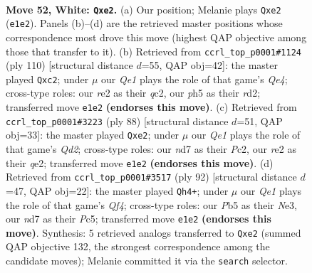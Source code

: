 \documentclass[11pt]{article}
\begin{document}
\clearpage

\begin{figure}[p]\centering
\begin{subfigure}{0.46\textwidth}\centering
\resizebox{\linewidth}{!}{%
\newchessgame
\chessboard[
  setfen={r7/3n3k/1q6/1P5p/p1Np4/P7/4r3/3RQ1K1 w - - 0 52},
  showmover=false,
  pgfstyle=straightmove, color=movearrow, markmove={e1-e2}
]}
\caption{}
\end{subfigure}\hfill
\begin{subfigure}{0.46\textwidth}\centering
\resizebox{\linewidth}{!}{%
\newchessgame
\chessboard[
  setfen={8/1p3k2/p4p2/P7/4Q1P1/5R1K/2qr3P/8 w - - 8 56},
  showmover=false,
  pgfstyle=straightmove, color=movearrow, markmove={e4-c2}
]}
\caption{}
\end{subfigure}
\\[4pt]
\begin{subfigure}{0.46\textwidth}\centering
\resizebox{\linewidth}{!}{%
\newchessgame
\chessboard[
  setfen={1r4k1/5R2/p5p1/2p5/2N5/1P4n1/K1PQq3/8 w - - 1 45},
  showmover=false,
  pgfstyle=straightmove, color=movearrow, markmove={d2-e2}
]}
\caption{}
\end{subfigure}\hfill
\begin{subfigure}{0.46\textwidth}\centering
\resizebox{\linewidth}{!}{%
\newchessgame
\chessboard[
  setfen={7k/5rq1/3Pr1p1/2P5/5Q2/p3N3/P1K5/6R1 w - - 1 47},
  showmover=false,
  pgfstyle=straightmove, color=movearrow, markmove={f4-h4}
]}
\caption{}
\end{subfigure}
\caption{\textbf{Move 52, White: \texttt{Qxe2}.} (a) Our position; Melanie plays \texttt{Qxe2} (\texttt{e1e2}). Panels (b)--(d) are the retrieved master positions whose correspondence most drove this move (highest QAP objective among those that transfer to it). (b) Retrieved from \texttt{ccrl\_top\_p0001\#1124} (ply 110) [structural distance $d$=55, QAP obj=42]: the master played \texttt{Qxc2}; under $\mu$ our \emph{Qe1} plays the role of that game's \emph{Qe4}; cross-type roles: our \emph{r}e2 as their \emph{q}c2, our \emph{p}h5 as their \emph{r}d2; transferred move \texttt{e1e2} \textbf{(endorses this move)}. (c) Retrieved from \texttt{ccrl\_top\_p0001\#3223} (ply 88) [structural distance $d$=51, QAP obj=33]: the master played \texttt{Qxe2}; under $\mu$ our \emph{Qe1} plays the role of that game's \emph{Qd2}; cross-type roles: our \emph{n}d7 as their \emph{P}c2, our \emph{r}e2 as their \emph{q}e2; transferred move \texttt{e1e2} \textbf{(endorses this move)}. (d) Retrieved from \texttt{ccrl\_top\_p0001\#3517} (ply 92) [structural distance $d$=47, QAP obj=22]: the master played \texttt{Qh4+}; under $\mu$ our \emph{Qe1} plays the role of that game's \emph{Qf4}; cross-type roles: our \emph{P}b5 as their \emph{N}e3, our \emph{n}d7 as their \emph{P}c5; transferred move \texttt{e1e2} \textbf{(endorses this move)}. Synthesis: 5 retrieved analogs transferred to \texttt{Qxe2} (summed QAP objective 132, the strongest correspondence among the candidate moves); Melanie committed it via the \texttt{search} selector.}
\label{fig:thought-m102}
\end{figure}
\end{document}
